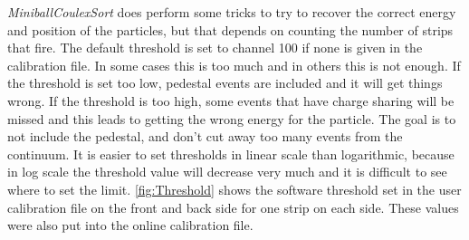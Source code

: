\documentclass[twoside,english]{uiofysmaster/uiofysmaster}
\let\orgautoref\autoref
\renewcommand{\autoref}
        {%
		 \def\subsectionautorefname{Section}%
		 \def\subsubsectionautorefname{Section}%
          \orgautoref}
\begin{document}
\textsl{MiniballCoulexSort} does perform some tricks to try to recover the correct energy and position of the particles, but that depends on counting the number of strips that fire. 
The default threshold is set to channel 100 if none is given in the calibration file.
In some cases this is too much and in others this is not enough. 
If the threshold is set too low, pedestal events are included and it will get things wrong. 
If the threshold is too high, some events that have charge sharing will be missed and this leads to getting the wrong energy for the particle.
The goal is to not include the pedestal, and don't cut away too many events from the continuum.
It is easier to set thresholds in linear scale than logarithmic, because in log scale the threshold value will decrease very much and it is difficult to see where to set the limit. 
\autoref{fig:Threshold} shows the software threshold set in the user calibration file on the front and back side for one strip on each side.
These values were also put into the online calibration file.
\end{document}
